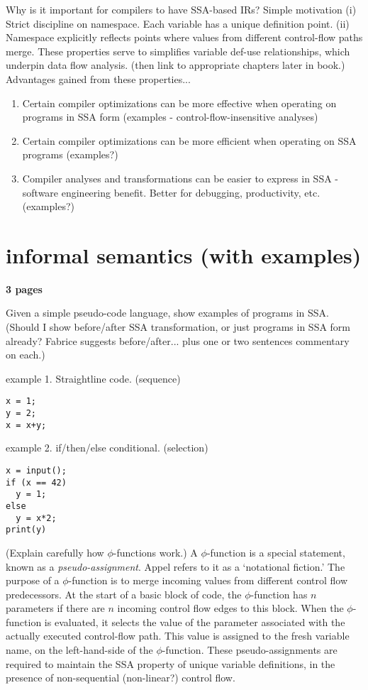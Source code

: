 Why is it important for compilers to have SSA-based IRs? Simple motivation
(i) Strict discipline on namespace. 
Each variable has a unique definition point.
(ii) Namespace explicitly reflects points where values from
different control-flow paths merge. 
These properties serve to simplifies variable def-use relationships,
which underpin data flow analysis.
(then link to appropriate chapters later in book.)
Advantages gained from these properties...
\begin{enumerate}
\item Certain compiler optimizations can be more effective
when operating on programs in SSA form
(examples - control-flow-insensitive
analyses)
\item Certain compiler optimizations can be more efficient
when operating on SSA programs (examples?) 
\item Compiler analyses and transformations can be easier
to express in SSA - software engineering benefit. Better
for debugging, productivity, etc. (examples?)
\end{enumerate}



\section{informal semantics (with examples)}

\textbf{3 pages}

Given a simple pseudo-code language, show examples of programs in SSA.
(Should I show before/after SSA transformation, or just programs
in SSA form already? Fabrice suggests before/after... plus
one or two sentences commentary on each.)

example 1. Straightline code. (sequence)

\begin{verbatim}
x = 1;
y = 2;
x = x+y;
\end{verbatim}

example 2. if/then/else conditional.  (selection)

\begin{verbatim}
x = input();
if (x == 42)
  y = 1;
else
  y = x*2;
print(y)
\end{verbatim}

(Explain carefully how $\phi$-functions work.) 
A $\phi$-function is a special statement, known as a
\textit{pseudo-assignment}.
Appel \cite{appelbook} refers to it as a `notational fiction.'
The purpose of a $\phi$-function is to merge
incoming values from different control flow predecessors.
At the start of a basic block of code, the $\phi$-function has
$n$ parameters if there are $n$ incoming control flow edges to this block.
When the $\phi$-function is evaluated, it selects the value
of the parameter associated  with the actually executed control-flow path.
This value is assigned to the fresh variable name, on the left-hand-side
of the $\phi$-function.
These pseudo-assignments are required to maintain the SSA property
of unique variable definitions,
in the presence of non-sequential (non-linear?) control flow.

